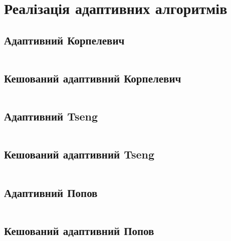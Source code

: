 \chapter{Реалізація адаптивних алгоритмів}

\section{Адаптивний Корпелевич}
\inputminted[linenos,fontsize=\tiny]{python}{src/adaptive_korpelevich.py}
\newpage

\section{Кешований адаптивний Корпелевич}
\inputminted[linenos,fontsize=\tiny]{python}{src/cached_adaptive_korpelevich.py}
\newpage

\section{Адаптивний Tseng}
\inputminted[linenos,fontsize=\tiny]{python}{src/adaptive_tseng.py}
\newpage

\section{Кешований адаптивний Tseng}
\inputminted[linenos,fontsize=\tiny]{python}{src/cached_adaptive_tseng.py}
\newpage

\section{Адаптивний Попов}
\inputminted[linenos,fontsize=\tiny]{python}{src/adaptive_popov.py}
\newpage

\section{Кешований адаптивний Попов}
\inputminted[linenos,fontsize=\tiny]{python}{src/cached_adaptive_popov.py}
